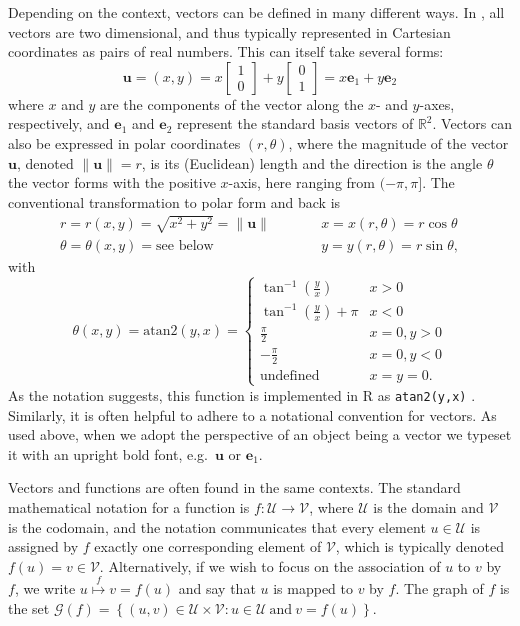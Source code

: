 Depending on the context, vectors can be defined in many different ways. In , all vectors are two dimensional, and thus typically represented in Cartesian coordinates as pairs of real numbers. This can itself take several forms:
\[\mathbf{u} = (x, y) = x\begin{bmatrix}1\\0\end{bmatrix} + y\begin{bmatrix}0\\1\end{bmatrix} = x\mathbf{e}_{1} + y\mathbf{e}_{2}\]
where \(x\) and \(y\) are the components of the vector along the \(x\)- and \(y\)-axes, respectively, and \(\mathbf{e}_{1}\) and \(\mathbf{e}_{2}\) represent the standard basis vectors of \(\mathbb{R}^{2}\). Vectors can also be expressed in polar coordinates \((r,\theta)\), where the magnitude of the vector \(\mathbf{u}\), denoted \(\|\mathbf{u}\| = r\), is its (Euclidean) length and the direction is the angle \(\theta\) the vector forms with the positive \(x\)-axis, here ranging from \((-\pi,\pi]\). The conventional transformation to polar form and back is
\[
\begin{array}{lcl}
r  =  r(x, y)  =  \sqrt{x^{2} + y^{2}}  =  \|\mathbf{u}\|   &\qquad& x  =  x(r, \theta)  =  r \cos \theta\\
\theta =  \theta(x, y)  =  \mbox{see below}                  &\qquad& y  =  y(r, \theta)  =  r \sin \theta,
\end{array}
\]
with
\[\theta(x, y) = \mbox{atan2}(y,x) = \begin{cases}
\tan^{-1}(\frac{y}{x})       & x > 0 \\
\tan^{-1}(\frac{y}{x}) + \pi & x < 0 \\
\frac{\pi}{2}                & x = 0, y > 0 \\
-\frac{\pi}{2}               & x = 0, y < 0 \\
\mbox{undefined}          & x = y = 0.
\end{cases}\]
As the notation suggests, this function is implemented in R as \texttt{atan2(y,x)} \citep{R}. Similarly, it is often helpful to adhere to a notational convention for vectors. As used above, when we adopt the perspective of an object being a vector we typeset it with an upright bold font, e.g.~\(\mathbf{u}\) or \(\mathbf{e}_{1}\).

Vectors and functions are often found in the same contexts. The standard mathematical notation for a function is \(f: \mathcal{U} \to \mathcal{V}\), where \(\mathcal{U}\) is the domain and \(\mathcal{V}\) is the codomain, and the notation communicates that every element \(u \in \mathcal{U}\) is assigned by \(f\) exactly one corresponding element of \(\mathcal{V}\), which is typically denoted \(f(u) = v \in \mathcal{V}\). Alternatively, if we wish to focus on the association of \(u\) to \(v\) by \(f\), we write \(u \stackrel{f}{\longmapsto} v = f(u)\) and say that \(u\) is mapped to \(v\) by \(f\). The graph of \(f\) is the set \(\mathcal{G}(f) = \left\{(u,v) \in \mathcal{U}\times\mathcal{V}: u \in \mathcal{U}~\mbox{and}~v = f(u)\right\}\).

